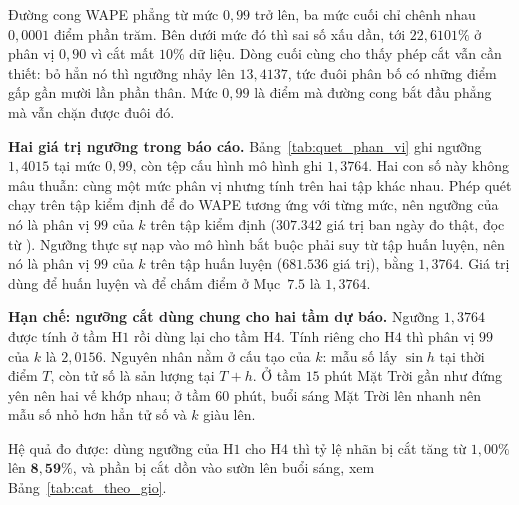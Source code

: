 Đường cong WAPE phẳng từ mức $0{,}99$ trở lên, ba mức cuối chỉ chênh nhau $0{,}0001$ điểm
phần trăm. Bên dưới mức đó thì sai số xấu dần, tới $22{,}6101\%$ ở phân vị $0{,}90$ vì cắt mất
$10\%$ dữ liệu. Dòng cuối cùng cho thấy phép cắt vẫn cần thiết: bỏ hẳn nó thì ngưỡng nhảy
lên $13{,}4137$, tức đuôi phân bố có những điểm gấp gần mười lần phần thân. Mức $0{,}99$ là
điểm mà đường cong bắt đầu phẳng mà vẫn chặn được đuôi đó.

\textbf{Hai giá trị ngưỡng trong báo cáo.} Bảng~\ref{tab:quet_phan_vi} ghi ngưỡng $1{,}4015$
tại mức $0{,}99$, còn tệp cấu hình mô hình ghi $1{,}3764$. Hai con số này không mâu thuẫn: cùng
một mức phân vị nhưng tính trên hai tập khác nhau. Phép quét chạy trên tập kiểm định để đo WAPE
tương ứng với từng mức, nên ngưỡng của nó là phân vị $99$ của $k$ trên tập kiểm định
($307.342$ giá trị ban ngày đo thật, đọc từ
). Ngưỡng thực sự nạp vào mô hình bắt buộc phải suy từ tập huấn
luyện, nên nó là phân vị $99$ của $k$ trên tập huấn luyện ($681.536$ giá trị), bằng $1{,}3764$.
Giá trị dùng để huấn luyện và để chấm điểm ở Mục~$7.5$ là $1{,}3764$.

\textbf{Hạn chế: ngưỡng cắt dùng chung cho hai tầm dự báo.} Ngưỡng $1{,}3764$ được tính ở tầm
H$1$ rồi dùng lại cho tầm H$4$. Tính riêng cho H$4$ thì phân vị $99$ của $k$ là $2{,}0156$.
Nguyên nhân nằm ở cấu tạo của $k$: mẫu số lấy $\sin h$ tại thời điểm $T$, còn tử số là sản
lượng tại $T+h$. Ở tầm $15$ phút Mặt Trời gần như đứng yên nên hai vế khớp nhau; ở tầm $60$
phút, buổi sáng Mặt Trời lên nhanh nên mẫu số nhỏ hơn hẳn tử số và $k$ giàu lên.

Hệ quả đo được: dùng ngưỡng của H$1$ cho H$4$ thì tỷ lệ nhãn bị cắt tăng từ $1{,}00\%$ lên
$\mathbf{8{,}59\%}$, và phần bị cắt dồn vào sườn lên buổi sáng, xem
Bảng~\ref{tab:cat_theo_gio}.

